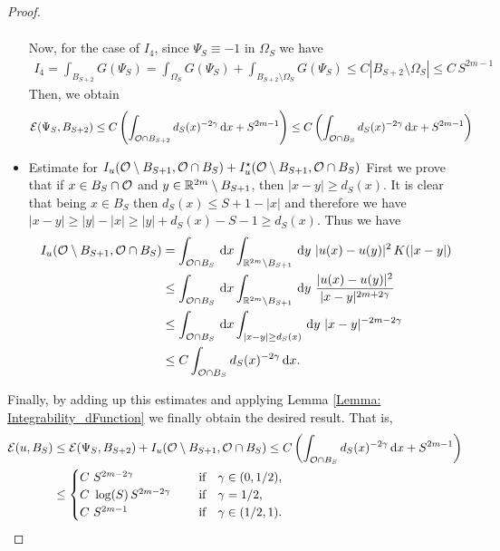 \begin{proof}
\begin{itemize}
\begin{align*}
\end{align*}
Now, for the case of $I_4$, since $\Psi_S\equiv -1$ in $\Omega_S$ we have
\begin{align*}
I_4 = \int_{B_{S+2}} G(\Psi_S) = \int_{\Omega_S} G(\Psi_S) + \int_{B_{S+2}\setminus \Omega_S} G(\Psi_S) \leq C |B_{S+2}\setminus \Omega_S| \leq C\,S^{2m-1}
\end{align*}
Then, we obtain
\begin{align*}
\mathcal{E}(\Psi_S,B_{S+2}) &\leq C \left(\int_{\mathcal{O} \cap B_{S+2}} d_S(x)^{-2\gamma} \,\mathrm{d} x + S^{2m-1} \right)\leq C\left(\int_{\mathcal{O} \cap B_{S}} d_S(x)^{-2\gamma} \,\mathrm{d} x + S^{2m-1} \right)
\end{align*}
\item Estimate for $I_u(\mathcal{O} \setminus B_{S+1}, \mathcal{O} \cap B_S) + I_u^\star(\mathcal{O} \setminus B_{S+1}, \mathcal{O} \cap B_S)$
First we prove that if $x\in B_S\cap \mathcal{O}$ and $y\in \mathbb{R}^{2m}\setminus B_{S+1}$, then $|x-y|\geq d_S(x)$. It is clear that being $x\in B_S$ then $d_S(x) \leq S+1-|x|$ and therefore we have $|x-y|\geq |y|-|x|\geq |y|+d_S(x)-S-1 \geq  d_S(x)$. Thus we have
\begin{align*}
I_u(\ocal \setminus B_{S+1}, \ocal \cap B_S) &= \int_{\ocal\cap B_S} \d x \int_{\R^{2m}\setminus B_{S+1}} \d y \ |u(x)-u(y)|^2 \, K(|x-y|) \\
&\leq \int_{\ocal\cap B_S} \d x \int_{\R^{2m}\setminus B_{S+1}} \d y \ \frac{|u(x)-u(y)|^2}{|x-y|^{2m+2\s}} \\
&\leq \int_{\ocal\cap B_S} \d x \int_{|x-y|\geq d_S(x)} \d y \ |x-y|^{-2m-2\s} \\
&\leq C \int_{\ocal \cap B_{S}} d_S(x)^{-2\s} \d x.
\end{align*}
\end{itemize}
Finally, by adding up this estimates and applying Lemma \ref{Lemma: Integrability_dFunction} we finally obtain the desired result. That is,
\begin{align*}
\mathcal{E}(u,B_S) &\leq \mathcal{E}(\Psi_S,B_{S+2}) + I_u(\mathcal{O} \setminus B_{S+1}, \mathcal{O} \cap B_S) \leq C\left(\int_{\mathcal{O} \cap B_{S}} d_S(x)^{-2\gamma} \,\mathrm{d} x + S^{2m-1} \right)\\
&\leq \begin{cases}
C \ S^{2m-2\gamma}\ \ \ &\textrm{if } \ \ \gamma\in(0,1/2),\\
C\ \log(S)\,S^{2m-2\gamma}\ \ \ \ &\textrm{if } \ \ \gamma=1/2,\\
C \ S^{2m-1}\ \ \ \ &\textrm{if } \ \ \gamma\in(1/2,1).\\
\end{cases}
\end{align*}

\end{proof}
